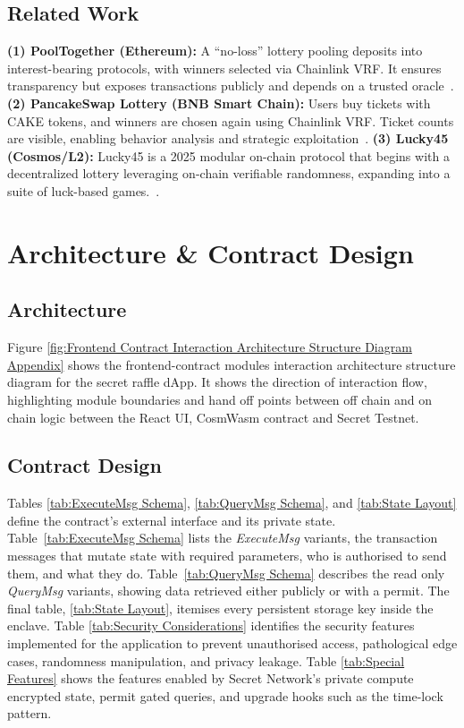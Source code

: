 \documentclass{article}
\begin{document}
\subsection{Related Work}
\textbf{(1) PoolTogether (Ethereum):} A ``no-loss'' lottery pooling deposits into interest-bearing protocols, with winners selected via Chainlink VRF. It ensures transparency but exposes transactions publicly and depends on a trusted oracle~\cite{PoolTogether}. \textbf{(2) PancakeSwap Lottery (BNB Smart Chain):} Users buy tickets with CAKE tokens, and winners are chosen again using Chainlink VRF. Ticket counts are visible, enabling behavior analysis and strategic exploitation~\cite{PancakeSwap}. \textbf{(3) Lucky45 (Cosmos/L2):} Lucky45 is a 2025 modular on-chain protocol that begins with a decentralized lottery leveraging on-chain verifiable randomness, expanding into a suite of luck-based games.~\cite{Lucky45}.

\section{Architecture \& Contract Design}

\subsection{Architecture}
Figure \ref{fig:Frontend Contract Interaction Architecture Structure Diagram Appendix} shows the frontend-contract modules interaction architecture structure diagram for the secret raffle dApp. It shows the direction of interaction flow, highlighting module boundaries and hand off points between off chain and on chain logic between the React UI, CosmWasm contract and Secret Testnet.

\subsection{Contract Design}

Tables \ref{tab:ExecuteMsg Schema}, \ref{tab:QueryMsg Schema}, and \ref{tab:State Layout} define the contract's external interface and its private state. Table~\ref{tab:ExecuteMsg Schema} lists the \emph{ExecuteMsg} variants, the transaction messages that mutate state with required parameters, who is authorised to send them, and what they do. Table~\ref{tab:QueryMsg Schema} describes the read only \emph{QueryMsg} variants, showing data retrieved either publicly or with a permit. The final table, \ref{tab:State Layout}, itemises every persistent storage key inside the enclave. Table \ref{tab:Security Considerations} identifies the security features implemented for the application to prevent unauthorised access, pathological edge cases, randomness manipulation, and privacy leakage. Table \ref{tab:Special Features} shows the features enabled by Secret Network's private compute encrypted state, permit gated queries, and upgrade hooks such as the time-lock pattern.
\end{document}

